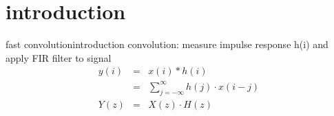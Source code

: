 


\subtitle{Part 9: Fast Convolution}


	

\section[intro]{introduction}
	\begin{frame}{fast convolution}{introduction}
		convolution: measure impulse response h(i) and apply FIR filter to signal
		\begin{eqnarray*}
			y(i) &=& x(i) \ast h(i)\\
				 &=& \sum\limits_{j=-\infty}^{\infty}{h(j)\cdot x(i-j)}\\
			Y(z) &=& X(z) \cdot H(z)
		\end{eqnarray*}
	\end{frame}

